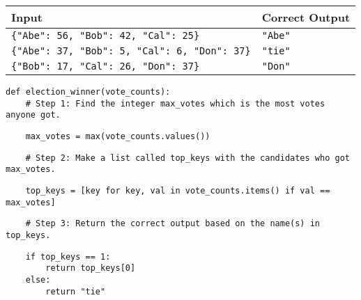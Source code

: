 \documentclass[12pt,answers]{exam}
\begin{document}
\begin{questions}
\begin{tabular}{|l|l|}
\hline
\textbf{Input} & \textbf{Correct Output} \\ \hline
\verb|{"Abe": 56, "Bob": 42, "Cal": 25}| & \verb|"Abe"| \hspace*{1in} \\ \hline
\verb|{"Abe": 37, "Bob": 5, "Cal": 6, "Don": 37}| & \verb|"tie"| \hspace*{1in} \\ \hline
\verb|{"Bob": 17, "Cal": 26, "Don": 37}| & \verb|"Don"| \hspace*{1in} \\ \hline
\end{tabular}

\begin{verbatim}
def election_winner(vote_counts):
    # Step 1: Find the integer max_votes which is the most votes anyone got.
\end{verbatim}
\begin{solution}
\begin{verbatim}
    max_votes = max(vote_counts.values())
\end{verbatim}
\end{solution}
\vfill









\begin{verbatim}
    # Step 2: Make a list called top_keys with the candidates who got max_votes. 
\end{verbatim}
\begin{solution}
\begin{verbatim}
    top_keys = [key for key, val in vote_counts.items() if val == max_votes]
\end{verbatim}
\end{solution}
\vfill








      
\begin{verbatim}
    # Step 3: Return the correct output based on the name(s) in top_keys. 
\end{verbatim}
\begin{solution}
\begin{verbatim}
    if top_keys == 1:
        return top_keys[0]
    else:
        return "tie"
\end{verbatim}
\end{solution}
\vfill






\end{questions}
\end{document}
